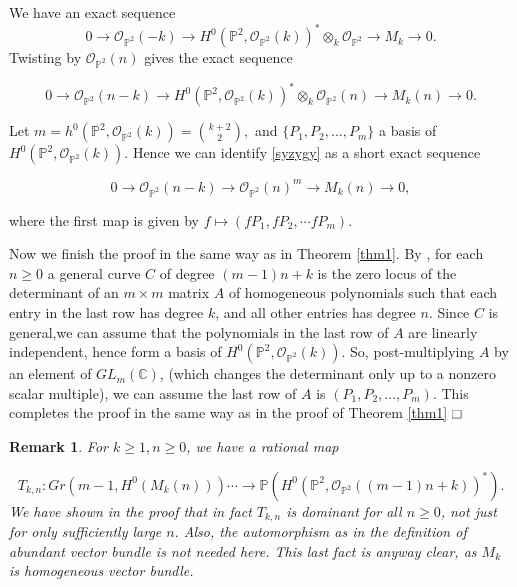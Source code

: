 \documentclass[11pt]{amsart}
\newtheorem{rem}[subsection]{Remark}
\theoremstyle{definition}
\newcommand{\OOO}{{\mathcal O}}
\renewcommand\square{\frame{\phantom{{\large x}}}}
\begin{document}
We have an exact
sequence 
 \begin{equation*}
 0 \to {\mathcal O}_{\mathbb{P}^2}(-k) \to H^0(\mathbb{P}^2,\mathcal{O}_{\mathbb{P}^2}(k))^*\otimes_k \mathcal{O}_{\mathbb{P}^2} \to M_k \to 0.
 \end{equation*}
 Twisting by $\mathcal {O}_{\mathbb{P}^2}(n)$ gives the exact sequence

 \begin{equation}\label{syzygy}
 0 \to {\mathcal O}_{\mathbb{P}^2}(n-k) \to H^0(\mathbb{P}^2,\mathcal{O}_{\mathbb{P}^2}(k))^*\otimes_k \mathcal{O}_{\mathbb{P}^2}(n) \to M_k (n)\to 0.
 \end{equation}

Let $m=h^0(\mathbb{P}^2,\mathcal{O}_{\mathbb{P}^2}(k))=\binom{k+2}{2},$ and 
$\{P_1,P_2,...,P_m\}$ a basis of $H^0(\mathbb{P}^2,\mathcal{O}_{\mathbb{P}^2}(k)).$
Hence we can identify \ref{syzygy} as a short exact sequence 

\begin{equation}
 0 \to {\mathcal O}_{\mathbb{P}^2}(n-k) \to  \mathcal{O}_{\mathbb{P}^2}(n)^m \to M_k (n)\to 0,
 \end{equation}

where the first map is given by $f\mapsto (fP_1,fP_2,\cdots fP_m)$.

Now we finish the proof in the same way as in Theorem \ref{thm1}. By \cite{LuJu}, for each $n\geq 0$ a general curve $C$ of degree $(m-1)n+k$ is the zero locus of the determinant of an $m\times m$ matrix $A$ of homogeneous polynomials such that each entry in the last row has degree $k$, and all other entries has degree $n$. Since $C$ is general,we can assume that the polynomials in the last row of $A$ are linearly independent, hence form 
a basis of $H^0(\mathbb{P}^2,\mathcal{O}_{\mathbb{P}^2}(k))$. So, post-multiplying $A$ by an element of $GL_m(\mathbb{C})$, (which changes the determinant only up to a nonzero scalar multiple), we can assume the last row of $A$ is $(P_1,P_2,...,P_m).$ This completes the proof in the same way as in the proof of Theorem \ref{thm1}
 $\hfill{\square}$

 \begin{rem}
    For $k\geq 1, n\geq 0$, we have a rational map

\[
 T_{k,n} : Gr(m-1, H^0(M_k(n)))
  \cdots\to \mathbb{P}(H^0(\mathbb{P}^2, \OOO_{\mathbb{P}^2}((m-1)n+k))^*).  
 \] We have shown in the proof that in fact $T_{k,n}$ is dominant for all $n\geq 0$, 
 not just for only sufficiently large $n.$ Also, the automorphism as in the 
 definition of abundant vector bundle is not needed here. This last fact is anyway 
 clear, as $M_k$ is homogeneous vector bundle.
\end{rem}
\end{document}
